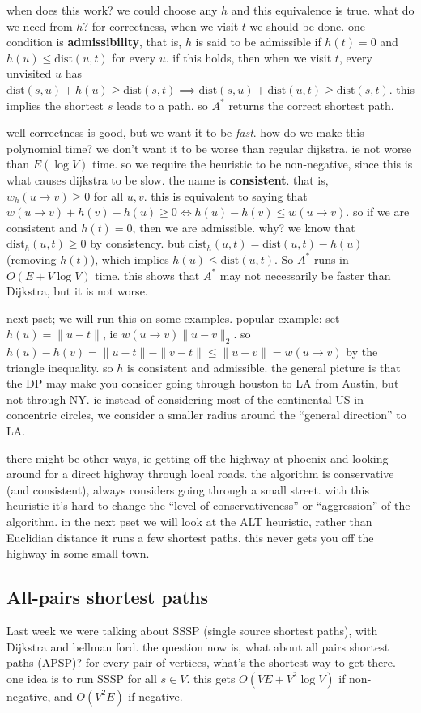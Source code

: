 when does this work? we could choose any $h$ and this equivalence is true. what do we need from $h$? for correctness, when we visit $t$ we should be done. one condition is \textbf{admissibility}, that is, $h$ is said to be admissible if $h(t)=0$ and $h(u) \leq \mathrm{dist}(u,t)$ for every $u$. if this holds, then when we visit $t$, every unvisited $u$ has $\mathrm{dist}(s,u)+h(u) \geq \mathrm{dist}(s,t)\implies \mathrm{dist}(s,u)+\mathrm{dist}(u,t) \geq \mathrm{dist}(s,t)$. this implies the shortest $s$ leads to a path. so $A^*$ returns the correct shortest path.

well correctness is good, but we want it to be \emph{fast}. how do we make this polynomial time? we don't want it to be worse than regular dijkstra, ie not worse than $E(\log V)$ time. so we require the heuristic to be non-negative, since this is what causes dijkstra to be slow. the name is \textbf{consistent}. that is, $w_h(u \to v) \geq 0$ for all $u,v$. this is equivalent to saying that $w(u \to v) +h(v)-h(u) \geq 0 \iff h(u)-h(v) \leq w(u \to v)$. so if we are consistent and $h(t)=0$, then we are admissible. why? we know that $\mathrm{dist}_h(u,t)\geq 0$ by consistency. but $\mathrm{dist}_h(u,t)=\mathrm{dist}(u,t)-h(u)$ (removing $h(t)$), which implies $h(u) \leq \mathrm{dist}(u,t)$. So $A^*$ runs in $O(E + V \log V)$ time. this shows that $A^*$ may not necessarily be faster than Dijkstra, but it is not worse.

    next pset; we will run this on some examples. popular example: set $h(u)=\|u-t\|$, ie $w(u \to v) \|u-v\|_2$. so $h(u)-h(v)= \|u-t\|-\| v-t\| \leq \|u-v\|=w(u \to v)$ by the triangle inequality. so $h$ is consistent and admissible. the general picture is that the DP may make you consider going through houston to LA from Austin, but not through NY. ie instead of considering most of the continental US in concentric circles, we consider a smaller radius around the ``general direction'' to LA.

    there might be other ways, ie getting off the highway at phoenix and looking around for a direct highway through local roads. the algorithm is conservative (and consistent), always considers going through a small street. with this heuristic it's hard to change the ``level of conservativeness'' or ``aggression'' of the algorithm. in the next pset we will look at the ALT heuristic, rather than Euclidian distance it runs a few shortest paths. this never gets you off the highway in some small town. 

    \subsection{All-pairs shortest paths}
    Last week we were talking about SSSP (single source shortest paths), with Dijkstra and bellman ford. the question now is, what about all pairs shortest paths (APSP)? for every pair of vertices, what's the shortest way to get there. one idea is to run SSSP for all $s \in V$. this gets $O(VE+V^2 \log V)$ if non-negative, and $O(V^2E)$ if negative. 

